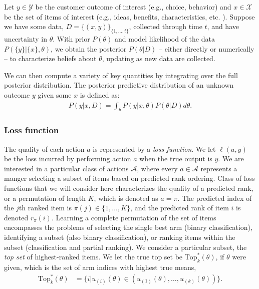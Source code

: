 \documentclass[blindrev,mnsc]{informs3}
\newcommand{\numitems}{K}
\newcommand{\topset}{\text{Top}_k}
\begin{document}
Let $y \in \mathcal{Y}$ be the customer outcome of interest (e.g., choice, behavior) and $x \in \mathcal{X}$ be the set of items of interest (e.g., ideas, benefits, characteristics, etc. ). Suppose we have some data, $D = \{(x,y)\}_{\{1,...,t\}}$, collected through time $t$, and have uncertainty in $\theta$. With prior $P(\theta)$ and model likelihood of the data $P(\{y\}|\{x\},\theta)$, we obtain the posterior $P(\theta|D)$ -- either directly or numerically -- to characterize beliefs about $\theta$, updating as new data are collected.

We can then compute a variety of key quantities by integrating over the full posterior distribution. The posterior predictive distribution of an unknown outcome $y$ given some $x$ is defined as:
\begin{align} 
P(y|x,D) = \int_\theta P(y|x,\theta)P(\theta|D)d\theta .
\end{align}

\subsubsection{Loss function}

The quality of each action $a$ is represented by a \emph{loss function}. We let $\ell(a,y)$ be the loss incurred by performing action $a$ when the true output is $y$. We are interested in a particular class of actions $\mathcal{A}$, where every $a \in \mathcal{A}$ represents a manger selecting a subset of items based on predicted rank ordering. Class of loss functions that we will consider here characterizes the quality of a predicted rank, or a permutation of length $\numitems$, which is denoted as $a=\pi$. The predicted index of the $j$th ranked item is $\pi(j) \in \{1,\ldots,\numitems\}$, and the predicted rank of item $i$ is denoted $r_\pi(i)$. Learning a complete permutation of the set of items encompasses the problems of selecting the single best arm (binary classification), identifying a subset (also binary classification), or ranking items within the subset (classification and partial ranking). We consider a particular subset, the \emph{top set} of highest-ranked items. We let the true top set be $\topset^{*}(\theta)$, if $\theta$ were given, which is the set of arm indices with highest true means, 
\begin{align}
\topset^{*}(\theta) &= \{i | u_{(i)}(\theta) \in ( u_{(1)}(\theta),\ldots,u_{(k)}(\theta) ) \}.
\end{align}
\end{document}
